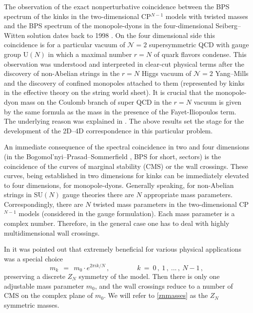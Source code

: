 \documentclass[epsfig,12pt]{article}
\def\beq{\begin{equation}}
\def\eeq{\end{equation}}
\def\beq{\begin{equation}}
\def\eeq{\end{equation}}
\begin{document}
	The observation of the exact nonperturbative coincidence between the BPS spectrum
	of the kinks in the two-dimensional CP$^{N-1}$ models with twisted masses and the BPS spectrum of the monopole-dyons
	in the four-dimensional Seiberg--Witten solution 
\cite{SeibergWitten}
	dates back to 1998 
\cite{Dorey:1998yh}. On the four dimensional side this coincidence is for a particular vacuum of ${\mathcal N}=2$
supersymmetric QCD with gauge group U$(N)$ in which a maximal number $r=N$ of quark flavors condense.
	This observation was understood and interpreted in clear-cut physical terms after the discovery of non-Abelian strings 
	\cite{1,2} in the $r=N$ Higgs vacuum of ${\mathcal N}=2$ Yang--Mills and the discovery of confined monopoles attached to them 
\cite{Shifman:2004dr,4} 
	(represented by kinks in the effective theory on the string world sheet). 
	It is crucial that the monopole-dyon mass  on the Coulomb branch of super QCD in the $r=N$ vacuum is given by the same formula  
	as the mass in the presence of  the  Fayet-Iliopoulos term.
	The underlying reason was explained in 
\cite{Shifman:2004dr,4}. 
	The above results  set the stage for the development of the 2D--4D correspondence in this particular problem.

	An immediate consequence of the spectral coincidence in two and four dimensions 
	(in the Bogomol'nyi--Prasad--Sommerfield 
\cite{BPS}, 
	BPS for short, sectors) 
	is the coincidence of the curves of marginal stability (CMS) or the  wall crossings.
	These curves, being established in two dimensions for kinks can be immediately elevated to four dimensions, for monopole-dyons. 
	Generally speaking, for non-Abelian strings in SU$(N)$ gauge theories there are $N$ appropriate mass parameters.
	Correspondingly, there are $N$ twisted mass parameters in the two-dimensional CP$^{N-1}$ models (considered in the gauge formulation). 
	Each mass parameter is a complex number. 
	Therefore, in the general case one has to deal with highly multidimensional 
	 wall crossings.

	In \cite{Gorsky} it was pointed out that extremely beneficial for various physical applications 
	was a special choice 
\beq
\label{znmasses}
	m_k ~~=~~ m_0 \cdot e^{2 \pi i k / N}\,,\qquad\qquad k~=~0\,,~1\,,~ ...\,,~ N-1\,,
\eeq
	preserving a discrete $Z_N$ symmetry of the model. 
	Then there is only one adjustable mass parameter $m_0$,
	and the  wall crossings reduce to a number of CMS on the complex plane of $m_0$.
	We will refer to \eqref{znmasses} as the $Z_N$ symmetric masses.
\end{document}
